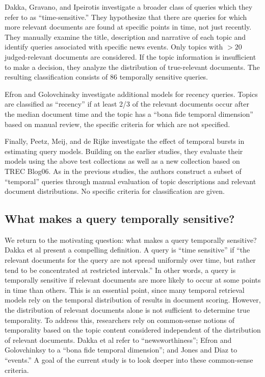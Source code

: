 \documentclass[runningheads,a4paper]{llncs}
\begin{document}
Dakka, Gravano, and Ipeirotis  \cite{Dakka2012} investigate a broader class of queries which they refer to as ``time-sensitive.'' They hypothesize that there are queries for which more relevant documents are found at specific points in time, not just recently. They manually examine the title, description and narrative of each topic and identify queries associated with specific news events. Only topics with $>20$ judged-relevant documents are considered. If the topic information is insufficient to make a decision, they analyze the distribution of true-relevant documents. The resulting classification consists of 86 temporally sensitive queries. 

Efron and Golovchinsky \cite{Efron2011} investigate additional models for recency queries.  Topics are classified as ``recency'' if at least 2/3 of the relevant documents occur after the median document time and the topic has a ``bona fide temporal dimension'' based on manual review, the specific criteria for which are not specified.  

Finally, Peetz, Meij, and de Rijke \cite{Peetz2013a} investigate the effect of temporal bursts in estimating query models. Building on the earlier studies, they evaluate their models using the above test collections as well as a new collection based on TREC Blog06. As in the previous studies, the authors construct a subset of ``temporal'' queries through manual evaluation of topic descriptions and relevant document distributions. No specific criteria for classification are given.

\subsection{What makes a query temporally sensitive?}

We return to the motivating question: what makes a query temporally sensitive? Dakka et al \cite{Dakka2012} present a compelling definition. A query is ``time sensitive''  if  ``the relevant documents for the query are not spread uniformly over time, but rather tend to be concentrated at restricted intervals.''  In other words, a query is temporally sensitive if relevant documents are more likely to occur at some points in time than others. This is an essential point, since many temporal retrieval models rely on the temporal distribution of results in document scoring. However, the distribution of relevant documents alone is not sufficient to determine true temporality. To address this, researchers rely on common-sense notions of temporality based on the topic content considered independent of the distribution of relevant documents. Dakka et al refer to ``newsworthiness''; Efron and Golovchinksy to a ``bona fide temporal dimension''; and Jones and Diaz to ``events.''  A goal of the current study is to look deeper into these common-sense criteria.
\end{document}
